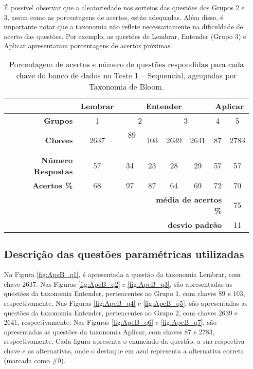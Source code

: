 É possível observar que a aleatoriedade nos sorteios das questões dos Grupos 2 e 3, assim como as porcentagens de acertos, estão adequadas. Além disso, é importante notar que a taxonomia não reflete necessariamente na dificuldade de acerto das questões. Por exemplo, as questões de Lembrar, Entender (Grupo 3) e Aplicar apresentaram porcentagens de acertos próximas.

\begin{table}[!ht]
    \centering
    \caption{Porcentagem de acertos e número de questões respondidas para cada chave do banco de dados no Teste 1 -- Sequencial, agrupadas por Taxonomia de Bloom.}
    \label{tab:respostas_atualizada}
    \begin{tabular}{|r|c|c|c|c|c|c|c|}
        \hline
         & \multicolumn{1}{c|}{\cellcolor{green!25}\textbf{Lembrar}} & \multicolumn{4}{c|}{\cellcolor{yellow!25}\textbf{Entender}} & \multicolumn{2}{c|}{\cellcolor{red!25}\textbf{Aplicar}} \\ \hline
        \textbf{Grupos} & 1 & \multicolumn{2}{c|}{2} & \multicolumn{2}{c|}{3} & 4 & 5 \\
        \hline \rowcolor[HTML]{D9D9D9} 
        \textbf{Chaves} & 2637 & \ 89 \ & 103 & 2639 & 2641 & 87 & 2783 \\
        \textbf{Número Respostas} & 57 & 34 & 23 & 28 & 29 & 57 & 57 \\\rowcolor[HTML]{D9D9D9} 
        \textbf{Acertos \%} & 68 & 97 & 87 & 64 & 69 & 72 & 70 \\
        \hline
        \multicolumn{3}{r}{} & \multicolumn{4}{r}{\cellcolor[HTML]{F9CB9C}\textbf{média de acertos \%}} & \multicolumn{1}{c}{\cellcolor[HTML]{F9CB9C}75} \\ 
        \multicolumn{3}{r}{} & \multicolumn{4}{r}{\cellcolor[HTML]{F9CB9C}\textbf{desvio padrão}} & \multicolumn{1}{c}{\cellcolor[HTML]{F9CB9C}11} \\ 
    \end{tabular}
\end{table}

\subsection{Descrição das questões paramétricas utilizadas}\label{sec:questoesTeste1}

Na Figura \ref{fig:ApeB_q1}, é apresentada a questão da taxonomia Lembrar, com chave 2637. Nas Figuras \ref{fig:ApeB_q2} e \ref{fig:ApeB_q3}, são apresentadas as questões da taxonomia Entender, pertencentes ao Grupo 1, com chaves 89 e 103, respectivamente. Nas Figuras \ref{fig:ApeB_q4} e \ref{fig:ApeB_q5}, são apresentadas as questões da taxonomia Entender, pertencentes ao Grupo 2, com chaves 2639 e 2641, respectivamente. Nas Figuras \ref{fig:ApeB_q6} e \ref{fig:ApeB_q7}, são apresentadas as questões da taxonomia Aplicar, com chaves 87 e 2783, respectivamente. Cada figura apresenta o enunciado da questão, a sua respectiva chave e as alternativas, onde o destaque em azul representa a alternativa correta (marcada como \#0). 


